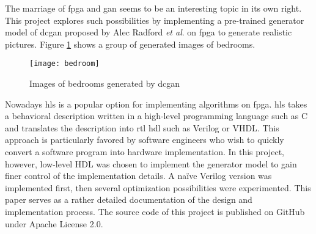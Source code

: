 The marriage of \gls{fpga} and \gls{gan} seems to be an interesting topic in its own right. This project
explores such possibilities by implementing a pre-trained generator model of \gls{dcgan} proposed by
Alec Radford \textit{et al}. \cite{radford:conv_gan} on \gls{fpga} to generate realistic pictures.
Figure \ref{fig:bedroom} shows a group of generated images of bedrooms.

\begin{figure}[h]
  \centering
  \texttt{[image: bedroom]}
  \caption{Images of bedrooms generated by \gls{dcgan} \cite{radford:conv_gan}}
  \label{fig:bedroom}
\end{figure}

Nowadays \gls{hls} is a popular option for implementing algorithms on \gls{fpga}. \gls{hls} takes a
behavioral description written in a high-level programming language such as C and translates the description
into \gls{rtl} \gls{hdl} such as Verilog or VHDL. This approach is particularly favored by software
engineers who wish to quickly convert a software program into hardware implementation. In this project,
however, low-level HDL was chosen to implement the generator model to gain finer control of the implementation
details. A naïve Verilog version was implemented first, then several optimization possibilities were
experimented. This paper serves as a rather detailed documentation of the design and implementation process.
The source code of this project is published on GitHub \cite{github:dcgan_fpga} under Apache License 2.0.

\clearpage %
